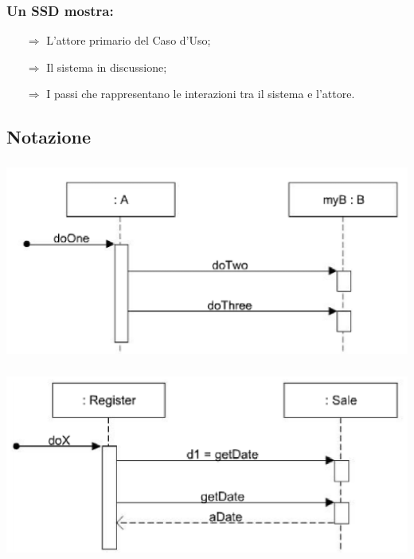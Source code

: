 \subsubsection{Un SSD mostra:}

\begin{itemize}
    \item [$\Rightarrow$] L'attore primario del Caso d'Uso;
    \item [$\Rightarrow$] Il sistema in discussione;
    \item [$\Rightarrow$] I passi che rappresentano le interazioni tra il sistema e l'attore.
\end{itemize}


\subsection{Notazione}

\subsubsection{}

\begin{center}
    \includegraphics[scale=0.33]{images/Notazione SSD.png}
\end{center}

\subsubsection{}

\begin{center}
    \includegraphics[scale=0.33]{images/Notazione SSD2.png}
\end{center}


